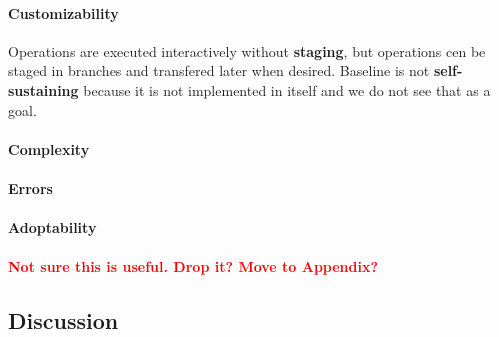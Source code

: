 \documentclass[english,submission]{programming}
\theoremstyle{definition}
\begin{document}
\paragraph{Customizability} Operations are executed interactively without \textbf{staging}, but operations cen be staged in branches and transfered later when desired. Baseline is not \textbf{self-sustaining} because it is not implemented in itself and we do not see that as a goal.

\paragraph{Complexity}

\paragraph{Errors}

\paragraph{Adoptability}


\paragraph{\textcolor{red}{Not sure this is useful. Drop it? Move to Appendix?}}


\subsection{Discussion}




\end{document}
